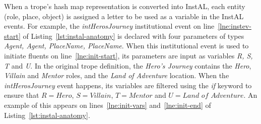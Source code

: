 \documentclass[11pt]{report}
\begin{document}
When a trope's hash map representation is converted into InstAL, each entity
(role, place, object) is assigned a letter to be used as a variable in the
InstAL events. For example, the \emph{intHerosJourney} institutional event on
line~\ref{lne:instev-start} of Listing~\ref{lst:instal-anatomy} is declared with four parameters of types
\emph{Agent, Agent, PlaceName, PlaceName}. When this institutional event is used
to initiate fluents on line~\ref{lne:init-start}, its parameters are input as
variables \emph{R, S, T} and \emph{U}. In the original trope definition, the
\emph{Hero's Journey} contains the \emph{Hero}, \emph{Villain} and \emph{Mentor}
roles, and the \emph{Land of Adventure} location. When the
\emph{intHerosJourney} event happens, its variables are filtered using the
\emph{if} keyword to ensure that $R = \textit{Hero}$, $S = \textit{Villain}$, $T
= \textit{Mentor}$ and $U = \textit{Land of Adventure}$. An example of this
appears on lines~\ref{lne:init-vars} and~\ref{lne:init-end} of Listing~\ref{lst:instal-anatomy}.
\end{document}
